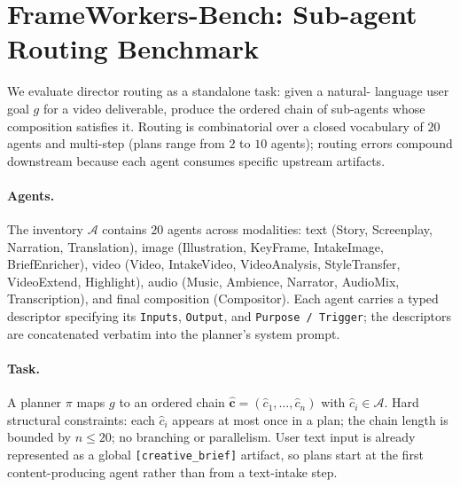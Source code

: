 \section{FrameWorkers-Bench: Sub-agent Routing Benchmark}
\label{sec:bench}

We evaluate director routing as a standalone task: given a natural-
language user goal $g$ for a video deliverable, produce the ordered
chain of sub-agents whose composition satisfies it. Routing is
combinatorial over a closed vocabulary of $20$ agents and multi-step
(plans range from $2$ to $10$ agents); routing errors compound
downstream because each agent consumes specific upstream artifacts.

\paragraph{Agents.}
The inventory $\mathcal{A}$ contains $20$ agents across modalities:
text (Story, Screenplay, Narration, Translation), image
(Illustration, KeyFrame, IntakeImage, BriefEnricher), video (Video,
IntakeVideo, VideoAnalysis, StyleTransfer, VideoExtend, Highlight),
audio (Music, Ambience, Narrator, AudioMix, Transcription), and
final composition (Compositor). Each agent carries a typed descriptor
specifying its \texttt{Inputs}, \texttt{Output}, and
\texttt{Purpose / Trigger}; the descriptors are concatenated verbatim
into the planner's system prompt.

\paragraph{Task.}
A planner $\pi$ maps $g$ to an ordered chain
$\hat{\mathbf{c}} = (\hat{c}_1, \dots, \hat{c}_n)$ with
$\hat{c}_i\!\in\!\mathcal{A}$. Hard structural constraints: each
$\hat{c}_i$ appears at most once in a plan; the chain length is bounded
by $n\!\le\!20$; no branching or parallelism. User text input is
already represented as a global \texttt{[creative\_brief]} artifact, so
plans start at the first content-producing agent rather than from a
text-intake step.


